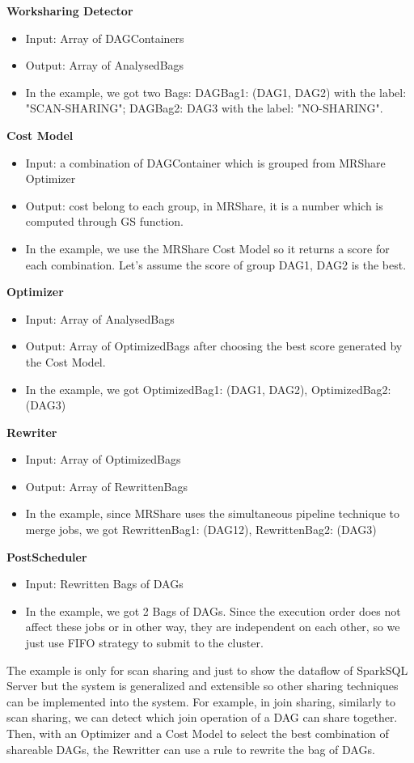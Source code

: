 \textbf{Worksharing Detector}
\begin{itemize}
\item Input: Array of DAGContainers
\item Output: Array of AnalysedBags
\item In the example, we got two Bags: DAGBag1: (DAG1, DAG2) with the label: "SCAN-SHARING"; DAGBag2: {DAG3} with the label: "NO-SHARING".
\end{itemize}

\textbf{Cost Model}
\begin{itemize}
\item Input: a combination of DAGContainer which is grouped from MRShare Optimizer
\item Output: cost belong to each group, in MRShare, it is a number which is computed through GS function.
\item In the example, we use the MRShare Cost Model so it returns a score for each combination. Let's assume the score of group {DAG1, DAG2} is the best.
\end{itemize}

\textbf{Optimizer}
\begin{itemize}
\item Input: Array of AnalysedBags
\item Output: Array of OptimizedBags after choosing the best score generated by the Cost Model.
\item In the example, we got OptimizedBag1: (DAG1, DAG2), OptimizedBag2: (DAG3)
\end{itemize}

\textbf{Rewriter}
\begin{itemize}
\item Input: Array of OptimizedBags
\item Output: Array of RewrittenBags
\item In the example, since MRShare uses the simultaneous pipeline technique to merge jobs, we got RewrittenBag1: (DAG12), RewrittenBag2: (DAG3)
\end{itemize}

\textbf{PostScheduler}
\begin{itemize}
\item Input: Rewritten Bags of DAGs
\item In the example, we got 2 Bags of DAGs. Since the execution order does not affect these jobs or in other way, they are independent on each other, so we just use FIFO strategy to submit to the cluster.
\end{itemize}

The example is only for scan sharing and just to show the dataflow of SparkSQL Server but the system is generalized and extensible so other sharing techniques can be implemented into the system. For example, in join sharing, similarly to scan sharing, we can detect which join operation of a DAG can share together. Then, with an Optimizer and a Cost Model to select the best combination of shareable DAGs, the Rewritter can use a rule to rewrite the bag of DAGs.